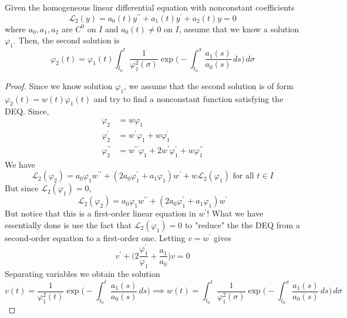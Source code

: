 \documentclass{article}
\newcounter{theorem}[section]
\begin{document}
      \begin{theorem}
        \label{thm:reduction-of-order-of-2nd-order-linear-deqs}
      Given the homogeneous linear differential equation with nonconstant coefficients 
      \begin{equation}
        \mathcal{L}_2 (y) = a_0 (t) y^{\prime\prime} + a_1 (t) y^\prime + a_2 (t) y = 0
      \end{equation}
      where $a_0, a_1, a_2$ are $C^0$ on $I$ and $a_0 (t) \neq 0$ on $I$, assume that we know a solution $\varphi_1$. Then, the second solution is
      \begin{equation}
        \varphi_2 (t) = \varphi_1 (t) \int_{t_0}^t \frac{1}{\varphi_1^2 (\sigma)} \exp \bigg(- \int_{t_0}^\sigma \frac{a_1 (s)}{a_0 (s)}\,ds \bigg) \, d\sigma
      \end{equation}
      \end{theorem}
      \begin{proof}
      Since we know solution $\varphi_1$, we assume that the second solution is of form $\varphi_2 (t) = w (t) \varphi_1 (t)$ and try to find a nonconstant function satisfying the DEQ. Since,
      \begin{align*}
          \varphi_2 & = w \varphi_1 \\
          \varphi_2^\prime & = w^\prime \varphi_1 + w \varphi_1^\prime \\
          \varphi_2^{\prime\prime} & = w^{\prime\prime} \varphi_1 + 2 w^\prime \varphi_1^\prime + w \varphi_1^{\prime\prime}
      \end{align*}
      We have
      \begin{equation}
        \mathcal{L}_2 (\varphi_2) = a_0 \varphi_1 w^{\prime\prime} + (2 a_0 \varphi_1^\prime + a_1 \varphi_1) w^\prime + w \mathcal{L}_2 (\varphi_1) \text{ for all } t \in I
      \end{equation}
      But since $\mathcal{L}_2 (\varphi_1) = 0$, 
      \begin{equation}
        \mathcal{L}_2 (\varphi_2) = a_0 \varphi_1 w^{\prime\prime} + (2 a_0 \varphi_1^\prime + a_1 \varphi_1) w^\prime
      \end{equation}
      But notice that this is a first-order linear equation in $w^\prime$! What we have essentially done is use the fact that $\mathcal{L}_2 (\varphi_1) = 0$ to "reduce" the the DEQ from a second-order equation to a first-order one. Letting $v = w^\prime$ gives 
      \begin{equation}
        v^\prime + \bigg( 2 \frac{\varphi_1^\prime}{\varphi_1} + \frac{a_1}{a_0} \bigg) v = 0
      \end{equation}
      Separating variables we obtain the solution
      \begin{equation}
        v(t) = \frac{1}{\varphi_1^2 (t)} \exp \bigg(- \int_{t_0}^t \frac{a_1(s)}{a_0 (s)} \,ds \bigg) \implies w(t) = \int_{t_0}^t \frac{1}{\varphi_1^2 (\sigma)} \exp \bigg(- \int_{t_0}^\sigma \frac{a_1(s)}{a_0 (s)} \,ds \bigg) \,d\sigma
      \end{equation}
      \end{proof}
\end{document}
